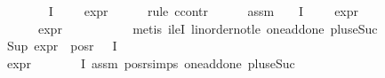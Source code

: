 \begin{isabellebody}
\ \ \isamarkupfalse%
\ {\isachardoublequoteopen}{\isasymforall}{\isasymchi}\ {\isasymin}\ {\isasymPhi}\ {\isacharbackquote}{\kern0pt}\ I{\isachardot}{\kern0pt}\ {\isasymchi}\ {\isasymnoteq}\ {\isasympsi}\ {\isasymlongrightarrow}\ expr{\isacharunderscore}{\kern0pt}{}\ {\isasymchi}\ {\isasymle}\ {}{\isachardoublequoteclose}\isanewline
\ \ \isamarkupfalse%
{\isacharparenleft}{\kern0pt}rule\ ccontr{\isacharparenright}{\kern0pt}\isanewline
\ \ \ \ \isamarkupfalse%
\ assm{\isacharcolon}{\kern0pt}\ {\isachardoublequoteopen}{\isasymnot}\ {\isacharparenleft}{\kern0pt}{\isasymforall}{\isasymchi}{\isasymin}{\isasymPhi}\ {\isacharbackquote}{\kern0pt}\ I{\isachardot}{\kern0pt}\ {\isasymchi}\ {\isasymnoteq}\ {\isasympsi}\ {\isasymlongrightarrow}\ expr{\isacharunderscore}{\kern0pt}{}\ {\isasymchi}\ {\isasymle}\ {}{\isacharparenright}{\kern0pt}{\isachardoublequoteclose}\isanewline
\ \ \ \ \isamarkupfalse%
\ \isamarkupfalse%
\ {\isasymchi}\ \ {\isachardoublequoteopen}{\isasymchi}\ {\isasymnoteq}\ {\isasympsi}{\isachardoublequoteclose}\ {\isachardoublequoteopen}expr{\isacharunderscore}{\kern0pt}{}\ {\isasymchi}\ {\isasymge}\ {}{\isachardoublequoteclose}\isanewline
\ \ \ \ \ \ \isamarkupfalse%
\ {\isacharparenleft}{\kern0pt}metis\ ileI{}\ linorder{\isacharunderscore}{\kern0pt}not{\isacharunderscore}{\kern0pt}le\ one{\isacharunderscore}{\kern0pt}add{\isacharunderscore}{\kern0pt}one\ plus{\isacharunderscore}{\kern0pt}{}{\isacharunderscore}{\kern0pt}eSuc{\isacharparenleft}{\kern0pt}{}{\isacharparenright}{\kern0pt}{\isacharparenright}{\kern0pt}\isanewline
\ \ \ \ \isamarkupfalse%
\ \isamarkupfalse%
\ {\isachardoublequoteopen}Sup\ {\isacharparenleft}{\kern0pt}expr{\isacharunderscore}{\kern0pt}{}\ {\isacharbackquote}{\kern0pt}\ {\isacharparenleft}{\kern0pt}pos{\isacharunderscore}{\kern0pt}r\ {\isacharparenleft}{\kern0pt}{\isasymPhi}\ {\isacharbackquote}{\kern0pt}\ I{\isacharparenright}{\kern0pt}{\isacharparenright}{\kern0pt}{\isacharparenright}{\kern0pt}\ {\isachargreater}{\kern0pt}{\isacharequal}{\kern0pt}\ {}{\isachardoublequoteclose}\isanewline
\ \ \ \ \ \ \isamarkupfalse%
\ {\isacartoucheopen}expr{\isacharunderscore}{\kern0pt}{}\ {\isasympsi}\ {\isasymge}\ {}{\isacartoucheclose}\ {\isacartoucheopen}{\isasympsi}\ {\isasymin}\ {\isacharparenleft}{\kern0pt}{\isasymPhi}\ {\isacharbackquote}{\kern0pt}\ I{\isacharparenright}{\kern0pt}{\isacartoucheclose}\ assm\ pos{\isacharunderscore}{\kern0pt}r{\isachardot}{\kern0pt}simps\ one{\isacharunderscore}{\kern0pt}add{\isacharunderscore}{\kern0pt}one\ plus{\isacharunderscore}{\kern0pt}{}{\isacharunderscore}{\kern0pt}eSuc{\isacharparenleft}{\kern0pt}{}{\isacharparenright}{\kern0pt}\isanewline

\end{isabellebody}
